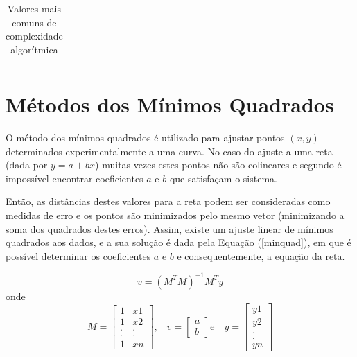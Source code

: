 {\begin{table}[h]
\begin{tabularx}{0.9\textwidth}{cX}
		\bottomrule
	\end{tabularx}
	\caption{ Valores mais comuns de complexidade algorítmica}
	\label{complexidadeAlgoritmica}
\end{table}


\section{Métodos dos Mínimos Quadrados}
\label{metminqua}

	O método dos mínimos quadrados é utilizado para ajustar pontos $(x,y)$ determinados experimentalmente a uma curva. No caso do ajuste a uma reta (dada por $y = a + bx$) muitas vezes estes pontos não são colineares e segundo \cite{minq} é impossível encontrar coeficientes $a$ e $b$ que satisfaçam o sistema.

	 Então, as distâncias destes valores para a reta podem ser consideradas como medidas de erro e os pontos são minimizados pelo mesmo vetor (minimizando a soma dos quadrados destes erros).  Assim, existe um ajuste linear de mínimos quadrados aos dados, e a sua solução é dada pela Equação (\ref{minquad}), em que é possível determinar os coeficientes $a$ e $b$ e consequentemente, a equação da reta. 

	\begin{equation}
		v =( M^{T}M)^{-1}M^{T}y
	\label{minquad}
	\end{equation}
	onde
	\begin{equation}
	M = \left[\begin{array}{cc}
               	1 & x1 \\
               	1 & x2  \\
		. & .  \\
               	. & .  \\
		1 & xn
          	         \end{array}\right] \mbox{,} \quad
	v = \left[\begin{array}{c}
               	a \\
               	b  
          	         \end{array}\right] \mbox{e} \quad
	y = \left[\begin{array}{c}
               	y1 \\
               	y2  \\
		.   \\
               	.   \\
		yn
          	         \end{array}\right] 	
	\label{variaveis}
	\end{equation}

}
